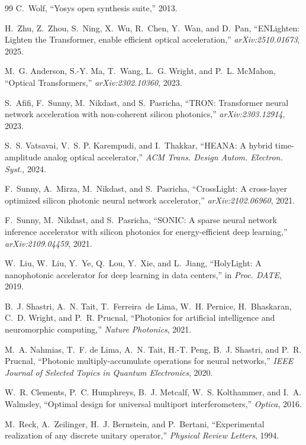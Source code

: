 \documentclass[10pt,journal]{IEEEtran}
\begin{document}
\begin{thebibliography}{99}
C.~Wolf,
``Yosys open synthesis suite,''
2013.

H.~Zhu, Z.~Zhou, S.~Ning, X.~Wu, R.~Chen, Y.~Wan, and D.~Pan,
``ENLighten: Lighten the Transformer, enable efficient optical acceleration,''
\emph{arXiv:2510.01673}, 2025.

M.~G. Anderson, S.-Y. Ma, T.~Wang, L.~G. Wright, and P.~L. McMahon,
``Optical Transformers,''
\emph{arXiv:2302.10360}, 2023.

S.~Afifi, F.~Sunny, M.~Nikdast, and S.~Pasricha,
``TRON: Transformer neural network acceleration with non-coherent silicon
photonics,''
\emph{arXiv:2303.12914}, 2023.

S.~S. Vatsavai, V.~S. P. Karempudi, and I.~Thakkar,
``HEANA: A hybrid time-amplitude analog optical accelerator,''
\emph{ACM Trans. Design Autom. Electron. Syst.}, 2024.

F.~Sunny, A.~Mirza, M.~Nikdast, and S.~Pasricha,
``CrossLight: A cross-layer optimized silicon photonic neural network
accelerator,''
\emph{arXiv:2102.06960}, 2021.

F.~Sunny, M.~Nikdast, and S.~Pasricha,
``SONIC: A sparse neural network inference accelerator with silicon photonics
for energy-efficient deep learning,''
\emph{arXiv:2109.04459}, 2021.

W.~Liu, W.~Liu, Y.~Ye, Q.~Lou, Y.~Xie, and L.~Jiang,
``HolyLight: A nanophotonic accelerator for deep learning in data centers,''
in \emph{Proc. DATE}, 2019.

B.~J. Shastri, A.~N. Tait, T.~Ferreira~de Lima, W.~H. Pernice,
H.~Bhaskaran, C.~D. Wright, and P.~R. Prucnal,
``Photonics for artificial intelligence and neuromorphic computing,''
\emph{Nature Photonics}, 2021.

M.~A. Nahmias, T.~F. de Lima, A.~N. Tait, H.-T. Peng, B.~J. Shastri,
and P.~R. Prucnal,
``Photonic multiply-accumulate operations for neural networks,''
\emph{IEEE Journal of Selected Topics in Quantum Electronics}, 2020.

W.~R. Clements, P.~C. Humphreys, B.~J. Metcalf, W.~S. Kolthammer,
and I.~A. Walmsley,
``Optimal design for universal multiport interferometers,''
\emph{Optica}, 2016.

M.~Reck, A.~Zeilinger, H.~J. Bernstein, and P.~Bertani,
``Experimental realization of any discrete unitary operator,''
\emph{Physical Review Letters}, 1994.

\end{thebibliography}
\end{document}
